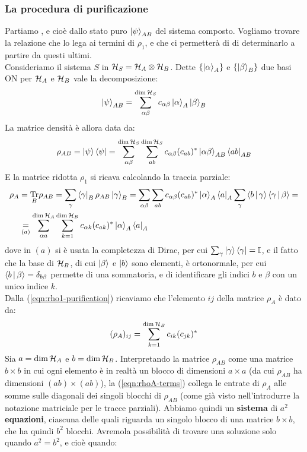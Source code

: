 \documentclass[../../InformazioneQuantistica.tex]{subfiles}
\begin{document}
\subsubsection{La procedura di purificazione}
Partiamo , e cioè dallo stato puro $\Ket{\psi}_{AB}$ del sistema composto. Vogliamo trovare la relazione che lo lega ai termini di $\rho_1$, e che ci permetterà di di determinarlo a partire da questi ultimi.\\
Consideriamo il sistema $S$ in $\mathcal{H}_S = \mathcal{H}_A \otimes \mathcal{H}_B$. Dette $\{\Ket{\alpha}_A\}$ e $\{\Ket{\beta}_B\}$ due basi ON per $\mathcal{H}_A$ e $\mathcal{H}_B$ vale la decomposizione:
\begin{align}
\Ket{\psi}_{AB} = \sum_{\alpha\beta}^{\operatorname{dim}\mathcal{H}_S} c_{\alpha \beta} \Ket{\alpha}_A \Ket{\beta}_B
\label{eqn:decomp-purif}
\end{align}
La matrice densità è allora data da:
\begin{align*}
\rho_{AB} = \Ket{\psi}\Bra{\psi} = \sum_{\alpha\beta}^{\operatorname{dim}\mathcal{H}_S}\sum_{ab}^{\operatorname{dim}\mathcal{H}_S} c_{\alpha \beta}(c_{ab})^* \Ket{\alpha\beta}_{AB} \Bra{ab}_{AB}
\end{align*}
E la matrice ridotta $\rho_1$ si ricava calcolando la traccia parziale:
\begin{align} \nonumber
\rho_A &= \underset{B}{\operatorname{Tr}} \rho_{AB} = \sum_\gamma \Bra{\gamma}_B \rho_{AB}\Ket{\gamma}_B = \sum_{\alpha\beta}\sum_{ab} c_{\alpha \beta}(c_{ab})^* \Ket{\alpha}_A \Bra{a}_A \sum_\gamma \Braket{b|\gamma}\Braket{\gamma|\beta} =\\
&\underset{(a)}{=} \sum_{\alpha a}^{\operatorname{dim}\mathcal{H}_A} \sum_{k=1}^{\operatorname{dim}\mathcal{H}_B} c_{\alpha k} (c_{ak})^* \Ket{\alpha}_A \Bra{a}_A \label{eqn:rho1-purification}
\end{align}
dove in $(a)$ si è usata la completezza di Dirac, per cui $\sum_\gamma \Ket{\gamma}\Bra{\gamma}=\mathbb{I}$, e il fatto che la base di $\mathcal{H}_B$, di cui $\Ket{\beta}$ e $\Ket{b}$ sono elementi, è ortonormale, per cui $\Braket{b|\beta}=\delta_{b\beta}$ permette di  una sommatoria, e di identificare gli indici $b$ e $\beta$ con un unico indice $k$.\\
Dalla (\ref{eqn:rho1-purification}) ricaviamo che l'elemento $ij$ della matrice $\rho_A$ è dato da:
\begin{align}
(\rho_A)_{ij} =\sum_{k=1}^{\operatorname{dim}\mathcal{H}_B} c_{ik}(c_{jk})^*
\label{eqn:rhoA-terms}
\end{align}
Sia $a = \operatorname{dim}\mathcal{H}_A$ e $b=\operatorname{dim}\mathcal{H}_B$.
Interpretando la matrice $\rho_{AB}$ come una matrice $b\times b$ in cui ogni elemento è in realtà un blocco di dimensioni $a \times a$ (da cui $\rho_{AB}$ ha dimensioni $(ab)\times (ab)$), la (\ref{eqn:rhoA-terms}) collega le entrate di $\rho_A$ alle somme sulle diagonali dei singoli blocchi di $\rho_{AB}$ (come già visto nell'introdurre la notazione matriciale per le tracce parziali). Abbiamo quindi un \textbf{sistema} di $a^2$ \textbf{equazioni}, ciascuna delle quali riguarda un singolo blocco di una matrice $b\times b$, che ha quindi $b^2$ blocchi. Avremola possibilità di trovare una soluzione solo quando $a^2 = b^2$, e cioè quando:
\end{document}
